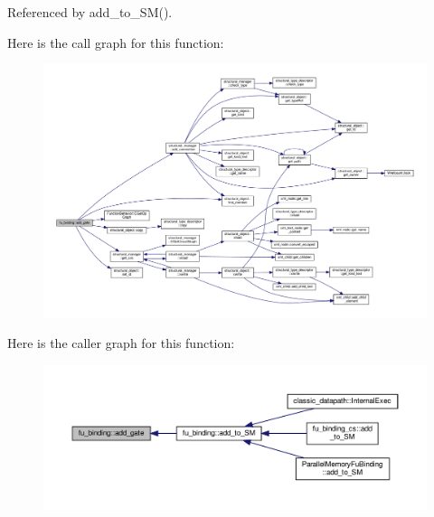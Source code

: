 Referenced by add\+\_\+to\+\_\+\+S\+M().

Here is the call graph for this function\+:
\nopagebreak
\begin{figure}[H]
\begin{center}
\leavevmode
\includegraphics[width=350pt]{d8/d04/classfu__binding_ab50cb0e1f4ae096856d058f4665636e2_cgraph}
\end{center}
\end{figure}
Here is the caller graph for this function\+:
\nopagebreak
\begin{figure}[H]
\begin{center}
\leavevmode
\includegraphics[width=350pt]{d8/d04/classfu__binding_ab50cb0e1f4ae096856d058f4665636e2_icgraph}
\end{center}
\end{figure}
\mbox{\label{classfu__binding_a1485a3490fff093e44664db54ecdf39a}} 
